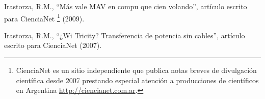 \documentclass[margin,line]{res}
\begin{document}
\begin{resume}
Irastorza, R.M., ``Más vale MAV en compu que cien volando'', artículo escrito para CienciaNet \footnote{CienciaNet es un sitio independiente que publica notas breves de divulgación científica desde 2007 prestando especial atención a producciones de científicos en Argentina \url{http://ciencianet.com.ar}.} (2009).

Irastorza, R.M., ``¿Wi Tricity? Transferencia de potencia sin cables'', artículo escrito para CienciaNet (2007).

% 
% 
% 
% 
% 
% 
% 
% 

\end{resume}
\end{document}
